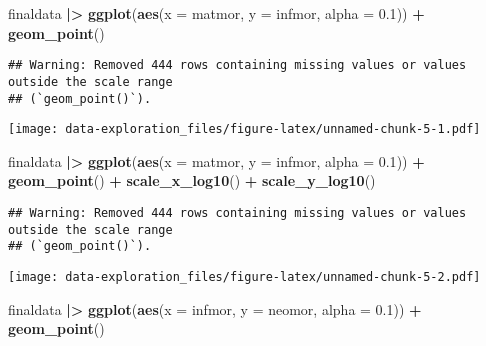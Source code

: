 \documentclass[
]{article}
\newenvironment{Shaded}{\begin{snugshade}}{\end{snugshade}}
\newcommand{\AttributeTok}[1]{\textcolor[rgb]{0.13,0.29,0.53}{#1}}
\newcommand{\FloatTok}[1]{\textcolor[rgb]{0.00,0.00,0.81}{#1}}
\newcommand{\FunctionTok}[1]{\textcolor[rgb]{0.13,0.29,0.53}{\textbf{#1}}}
\newcommand{\NormalTok}[1]{#1}
\newcommand{\SpecialCharTok}[1]{\textcolor[rgb]{0.81,0.36,0.00}{\textbf{#1}}}
\begin{document}
\begin{Shaded}
\begin{Highlighting}[]
\NormalTok{finaldata }\SpecialCharTok{|\textgreater{}}
  \FunctionTok{ggplot}\NormalTok{(}\FunctionTok{aes}\NormalTok{(}\AttributeTok{x =}\NormalTok{ matmor, }\AttributeTok{y =}\NormalTok{ infmor, }\AttributeTok{alpha =} \FloatTok{0.1}\NormalTok{)) }\SpecialCharTok{+}
  \FunctionTok{geom\_point}\NormalTok{()}
\end{Highlighting}
\end{Shaded}

\begin{verbatim}
## Warning: Removed 444 rows containing missing values or values outside the scale range
## (`geom_point()`).
\end{verbatim}

\texttt{[image: data-exploration\_files/figure-latex/unnamed-chunk-5-1.pdf]}

\begin{Shaded}
\begin{Highlighting}[]
\NormalTok{finaldata }\SpecialCharTok{|\textgreater{}}
  \FunctionTok{ggplot}\NormalTok{(}\FunctionTok{aes}\NormalTok{(}\AttributeTok{x =}\NormalTok{ matmor, }\AttributeTok{y =}\NormalTok{ infmor, }\AttributeTok{alpha =} \FloatTok{0.1}\NormalTok{)) }\SpecialCharTok{+}
  \FunctionTok{geom\_point}\NormalTok{() }\SpecialCharTok{+}
  \FunctionTok{scale\_x\_log10}\NormalTok{() }\SpecialCharTok{+}
  \FunctionTok{scale\_y\_log10}\NormalTok{()}
\end{Highlighting}
\end{Shaded}

\begin{verbatim}
## Warning: Removed 444 rows containing missing values or values outside the scale range
## (`geom_point()`).
\end{verbatim}

\texttt{[image: data-exploration\_files/figure-latex/unnamed-chunk-5-2.pdf]}

\begin{Shaded}
\begin{Highlighting}[]
\NormalTok{finaldata }\SpecialCharTok{|\textgreater{}}
  \FunctionTok{ggplot}\NormalTok{(}\FunctionTok{aes}\NormalTok{(}\AttributeTok{x =}\NormalTok{ infmor, }\AttributeTok{y =}\NormalTok{ neomor, }\AttributeTok{alpha =} \FloatTok{0.1}\NormalTok{)) }\SpecialCharTok{+}
  \FunctionTok{geom\_point}\NormalTok{()}
\end{Highlighting}
\end{Shaded}
\end{document}
